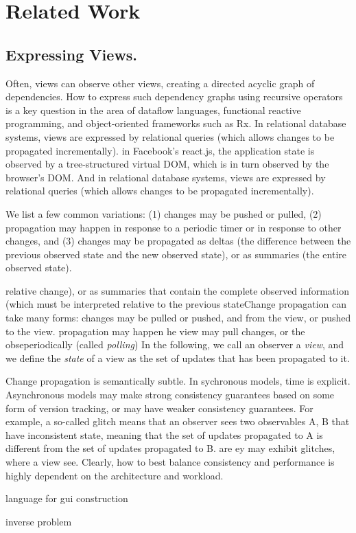 \section{Related Work}


\hidden
{
\subsection{Expressing Views.} Often, views can observe other views, creating a directed acyclic graph of dependencies. How to express such dependency graphs using recursive operators is a key question in the area of dataflow languages, functional reactive programming, and object-oriented frameworks such as Rx. In relational database systems, views are expressed by relational queries (which allows changes to be propagated incrementally). in Facebook's react.js, the application state is observed by a tree-structured virtual DOM, which is in turn observed by the browser's DOM. And in relational database systems, views are expressed by relational queries (which allows changes to be propagated incrementally). 

We list a few common variations: (1) changes may be pushed or pulled, (2) propagation may happen in response to a periodic timer or in response to other changes, and (3) changes may be propagated as deltas (the difference between the previous observed state and the new observed state), or as summaries (the entire observed state).

  relative change), or as summaries that contain the complete observed information  (which must be interpreted relative to the previous stateChange propagation can take many forms: changes may be pulled or pushed, and from the view, or pushed to the view. propagation may happen he view may pull changes, or the obseperiodically (called \emph{polling}) In the following, we call an observer a \emph{view}, and we define the \emph{state} of a view as the set of updates that has been propagated to it. 




Change propagation is semantically subtle. In sychronous models, time is explicit. Asynchronous models may make strong consistency guarantees based on some form of version tracking, or may have weaker consistency guarantees. For example, a so-called glitch means that an observer sees two observables A, B that have inconsistent state, meaning that the set of updates propagated to A is different from the set of updates propagated to B. are ey may exhibit glitches, where a view see. Clearly, how to best balance consistency and performance is highly dependent on the architecture and workload. 
}

\cite{burckhardt-leijen-yi-sadowski-ball-OOPSLA11}
\cite{camil}


\cite{alive}
\cite{react}

\cite{elm} language for gui construction

\cite{statelines} inverse problem


